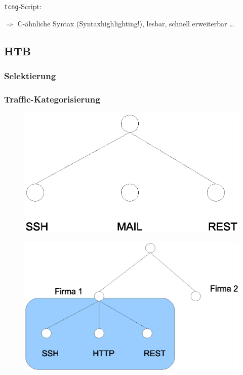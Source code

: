 \documentclass[14pt]{beamer}
\begin{document}
\begin{frame}%
\texttt{tcng}-Script:

\lstset{language=C, basicstyle=\tiny, showstringspaces=false, tabsize=2,breaklines=true}
  

$\Rightarrow$ C-ähnliche Syntax (Syntaxhighlighting!), lesbar, schnell erweiterbar \dots
\end{frame}


\subsection{HTB}
\subsubsection{Selektierung}
\begin{frame}
\frametitle<presentation>{Traffic-Kategorisierung}
\begin{figure}[h!]
      \includegraphics[width=1\textwidth]{GFX/bucket-hiracy-ssh-http-rest}
  \end{figure}
\end{frame}

\begin{frame}
\begin{figure}[h!]
      \includegraphics[width=1\textwidth]{GFX/bucket-hiracy-firma1-firma2}
  \end{figure}
\end{frame}
\end{document}

